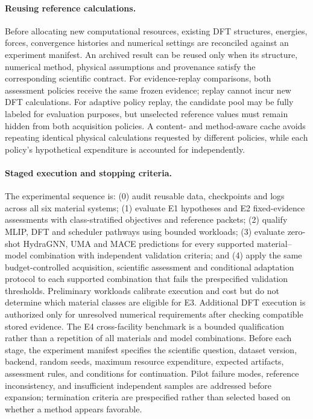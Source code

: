 \documentclass[11pt,a4paper]{article}
\begin{document}
\paragraph{Reusing reference calculations.}
Before allocating new computational resources, existing DFT structures, energies, forces, convergence histories and numerical settings are reconciled against an experiment manifest. An archived result can be reused only when its structure, numerical method, physical assumptions and provenance satisfy the corresponding scientific contract. For evidence-replay comparisons, both assessment policies receive the same frozen evidence; replay cannot incur new DFT calculations. For adaptive policy replay, the candidate pool may be fully labeled for evaluation purposes, but unselected reference values must remain hidden from both acquisition policies. A content- and method-aware cache avoids repeating identical physical calculations requested by different policies, while each policy's hypothetical expenditure is accounted for independently.

\paragraph{Staged execution and stopping criteria.}
The experimental sequence is: (0) audit reusable data, checkpoints and logs across all six material systems; (1) evaluate E1 hypotheses and E2 fixed-evidence assessments with class-stratified objectives and reference packets; (2) qualify MLIP, DFT and scheduler pathways using bounded workloads; (3) evaluate zero-shot HydraGNN, UMA and MACE predictions for every supported material--model combination with independent validation criteria; and (4) apply the same budget-controlled acquisition, scientific assessment and conditional adaptation protocol to each supported combination that fails the prespecified validation thresholds. Preliminary workloads calibrate execution and cost but do not determine which material classes are eligible for E3. Additional DFT execution is authorized only for unresolved numerical requirements after checking compatible stored evidence. The E4 cross-facility benchmark is a bounded qualification rather than a repetition of all materials and model combinations. Before each stage, the experiment manifest specifies the scientific question, dataset version, backend, random seeds, maximum resource expenditure, expected artifacts, assessment rules, and conditions for continuation. Pilot failure modes, reference inconsistency, and insufficient independent samples are addressed before expansion; termination criteria are prespecified rather than selected based on whether a method appears favorable.
\end{document}
